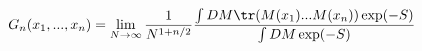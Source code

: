 \begin{equation}
    G_n(x_1,...,x_n)=\lim_{N \to
    \infty}\frac{1}{N^{1+n/2}}\dfrac{\int DM \tr( M(x_1)... M(x_n))\exp
    (-S)}{\int DM \exp (-S)}
\end{equation}

